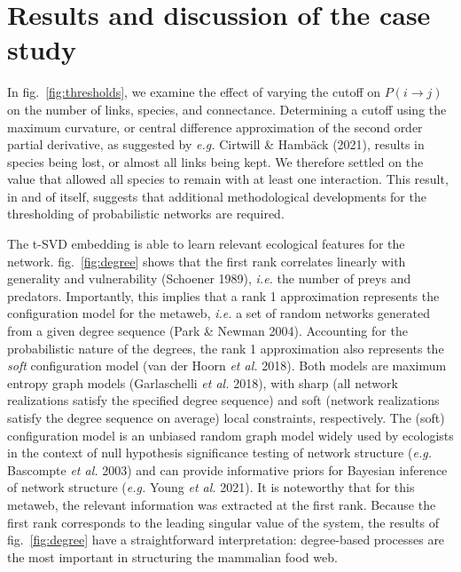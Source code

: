 \documentclass[11pt]{article}
\begin{document}
\hypertarget{results-and-discussion-of-the-case-study}{%
\section{Results and discussion of the case
study}\label{results-and-discussion-of-the-case-study}}

In fig.~\ref{fig:thresholds}, we examine the effect of varying the
cutoff on \(P(i \rightarrow j)\) on the number of links, species, and
connectance. Determining a cutoff using the maximum curvature, or
central difference approximation of the second order partial derivative,
as suggested by \emph{e.g.} Cirtwill \& Hambäck (2021), results in
species being lost, or almost all links being kept. We therefore settled
on the value that allowed all species to remain with at least one
interaction. This result, in and of itself, suggests that additional
methodological developments for the thresholding of probabilistic
networks are required.


The t-SVD embedding is able to learn relevant ecological features for
the network. fig.~\ref{fig:degree} shows that the first rank correlates
linearly with generality and vulnerability (Schoener 1989), \emph{i.e.}
the number of preys and predators. Importantly, this implies that a rank
1 approximation represents the configuration model for the metaweb,
\emph{i.e.} a set of random networks generated from a given degree
sequence (Park \& Newman 2004). Accounting for the probabilistic nature
of the degrees, the rank 1 approximation also represents the \emph{soft}
configuration model (van der Hoorn \emph{et al.} 2018). Both models are
maximum entropy graph models (Garlaschelli \emph{et al.} 2018), with
sharp (all network realizations satisfy the specified degree sequence)
and soft (network realizations satisfy the degree sequence on average)
local constraints, respectively. The (soft) configuration model is an
unbiased random graph model widely used by ecologists in the context of
null hypothesis significance testing of network structure (\emph{e.g.}
Bascompte \emph{et al.} 2003) and can provide informative priors for
Bayesian inference of network structure (\emph{e.g.} Young \emph{et al.}
2021). It is noteworthy that for this metaweb, the relevant information
was extracted at the first rank. Because the first rank corresponds to
the leading singular value of the system, the results of
fig.~\ref{fig:degree} have a straightforward interpretation:
degree-based processes are the most important in structuring the
mammalian food web.
\end{document}
